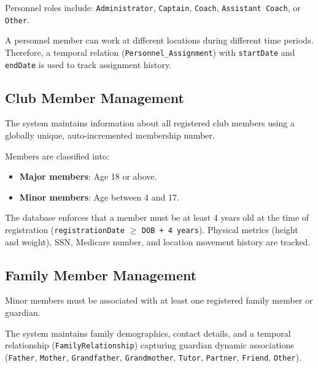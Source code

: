 \documentclass[11pt,a4paper]{article}
\begin{document}
Personnel roles include:
\texttt{Administrator}, \texttt{Captain}, \texttt{Coach}, \texttt{Assistant Coach}, or \texttt{Other}.


A personnel member can work at different locations during different time
periods. Therefore, a temporal relation (\texttt{Personnel\_Assignment}) with
\texttt{startDate} and \texttt{endDate} is used to track assignment history.



\subsection{Club Member Management}


The system maintains information about all registered club members using a globally
unique, auto-incremented membership number.


Members are classified into:


\begin{itemize}

\item \textbf{Major members}: Age 18 or above.

\item \textbf{Minor members}: Age between 4 and 17.

\end{itemize}


The database enforces that a member must be at least 4 years old at the time of
registration (\texttt{registrationDate} $\ge$ \texttt{DOB + 4 years}). Physical metrics
(height and weight), SSN, Medicare number, and location movement history are tracked.



\subsection{Family Member Management}


Minor members must be associated with at least one registered family
member or guardian.


The system maintains family demographics, contact details, and a temporal
relationship (\texttt{FamilyRelationship}) capturing guardian dynamic associations
(\texttt{Father}, \texttt{Mother}, \texttt{Grandfather}, \texttt{Grandmother}, \texttt{Tutor}, \texttt{Partner}, \texttt{Friend}, \texttt{Other}).
\end{document}

